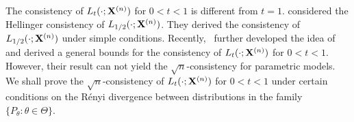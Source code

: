 \documentclass[11pt]{article}
\theoremstyle{plain}
\newtheorem{proposition}{\quad\quad Proposition}
\theoremstyle{definition}
\theoremstyle{remark}
\begin{document}





The consistency of $L_t(\cdot;\mathbf{X}^{(n)})$ for $0<t<1$ is different from $t=1$.
\cite{kar10563} considered the Hellinger consistency of $L_{1/2}(\cdot;\mathbf{X}^{(n)})$.
They derived the consistency of $L_{1/2}(\cdot;\mathbf{X}^{(n)})$ under simple conditions.
Recently,~\cite{Bha2016} further developed the idea of~\cite{kar10563} and derived a general bounds for the consistency of $L_t(\cdot;\mathbf{X}^{(n)})$ for $0<t<1$.
However, their result can not yield the $\sqrt{n}$-consistency for parametric models.
We shall prove the $\sqrt{n}$-consistency of $L_{t}(\cdot;\mathbf{X}^{(n)})$ for $0<t<1$ under certain conditions on the R\'{e}nyi divergence between distributions in the family $\{P_\theta:\theta\in\Theta\}$.
\end{document}
